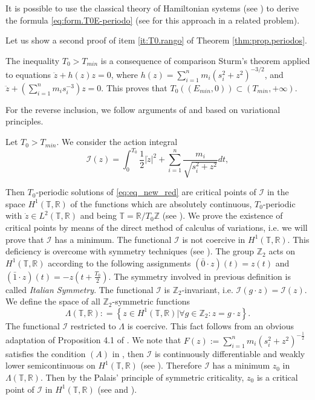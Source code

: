 \documentclass[smallcondensed]{svjour3}
\newcommand{\rr}{\mathbb{R}}
\begin{document}
\begin{remark}
 It is possible to use the classical theory of Hamiltonian systems (see \cite{A}) to derive the formula \eqref{eq:form.T0E-periodo} (see \cite{acinas2014estimates} for this approach in a related problem).
\end{remark}



\begin{remark}
Let us show a second proof of item \ref{it:T0.rango} of Theorem \ref{thm:prop.periodos}.

The inequality $T_0>T_{min}$ is a consequence of comparison Sturm's theorem applied to equations  $\ddot{z}+h(z)z=0$, where $h(z)=\sum_{i=1}^{n} m_i \left(s_i^2 +z^2\right)^{-3/2}$, and $\ddot{z}+\left(\sum_{i=1}^{n} m_i s_i^{-3}\right)z=0$. This proves that $T_0\left((E_{min},0)\right)\subset(T_{min},+\infty)$.

For the reverse inclusion,  we  follow arguments of \cite{zhao2015nonplanar} and \cite{li2013characterization} based on variational principles.


Let $T_0>T_{min}$. We consider the action integral
\[\mathcal{I}(z)=\int_0^{T_0}\frac12|\dot{z}|^2+\sum_{i=1}^n\frac{m_i}{\sqrt{s_i^2+z^2}}dt,\]

Then $T_0$-periodic solutions of \eqref{eq:eq_new_red} are critical points of $\mathcal{I}$ in the space $H^1(\mathbb{T},\rr)$ of the functions which are  absolutely continuous, $T_0$-periodic with $\dot{z}\in L^2(\mathbb{T},\rr)$ and being $\mathbb{T}=\rr/T_0\mathbb{Z}$ (see \cite[Cor. 1.1]{Mawhin2010}). We prove the existence of critical points by means of the direct method of calculus of variations, i.e. we will prove that $\mathcal{I}$ has a minimum.  The functional $\mathcal{I}$ is not coercive in $H^1(\mathbb{T},\rr)$.  This deficiency is overcome with symmetry techniques (see \cite{David-2004}). The group $\mathbb{Z}_2$ acts on $H^1(\mathbb{T},\rr)$ according to the following assignments $(\bar{0}\cdot z)(t)=z(t)$ and $(\bar{1}\cdot z)(t)=-z(t+\frac{T_0}{2})$. The symmetry involved in previous definition is called \emph{Italian Symmetry}. The functional $\mathcal{I}$ is $\mathbb{Z}_2$-invariant, i.e. $\mathcal{I}(g\cdot z)=\mathcal{I}(z)$. We define the space of all $\mathbb{Z}_
2$-symmetric functions
\[\Lambda(\mathbb{T},\mathbb{R}):
=\left\{ z\in H^1(\mathbb{T},\rr) | \forall g\in \mathbb{Z}_2 : z=g\cdot z \right\}.\]
The functional $\mathcal{I}$ restricted to $\Lambda$  is coercive. This fact follows from an obvious adaptation of Proposition 4.1 of \cite{David-2004}. We note that $F(z):=\sum_{i=1}^nm_i(s_i^2+z^2)^{-\frac{1}{2}}$ satisfies the condition $(A)$ in \cite[p. 12]{Mawhin2010}, then $\mathcal{I}$  is continuously differentiable and weakly lower semicontinuous on $H^1(\mathbb{T},\rr)$ (see \cite[p. 13]{Mawhin2010}). Therefore $\mathcal{I}$ has a minimum $z_0$ in $\Lambda(\mathbb{T},\mathbb{R})$. Then by the Palais' principle of symmetric criticality,  $z_0$ is a critical point of $\mathcal{I}$ in $H^1(\mathbb{T},\rr)$ (see \cite{David-2004} and \cite{RichardPalais274}).


\end{remark}
\end{document}
